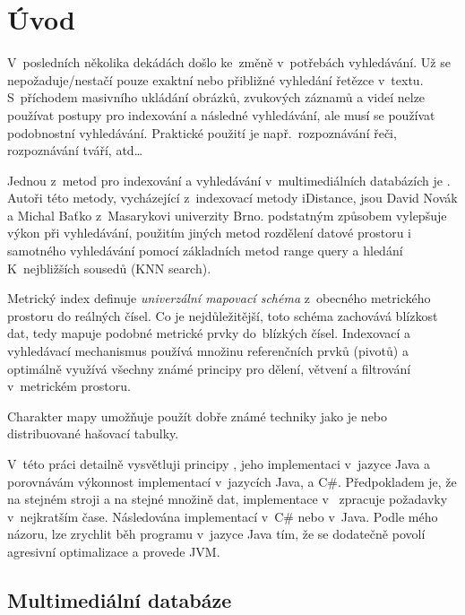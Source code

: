 \chapter{Úvod}

V~posledních několika dekádách došlo ke~změně v~potřebách vyhledávání.
Už se nepožaduje/nestačí pouze exaktní nebo přibližné vyhledání řetězce
v~textu. S~příchodem masivního ukládání obrázků, zvukových záznamů
a videí nelze používat  postupy pro indexování a následné
vyhledávání, ale musí se používat podobnostní vyhledávání. Praktické
použití je např.~rozpoznávání řeči, rozpoznávání tváří, atd\ldots{}

Jednou z~metod pro indexování a vyhledávání v~multimediálních databázích
je \MIndex{}\cite{Novak:2009:MIE:1637863.1638184}\@. Autoři této
metody, vycházející z~indexovací metody iDistance\cite{Jagadish:2005:IAB:1071610.1071612},
jsou David Novák a Michal Baťko z~Masarykovi univerzity Brno\@.
\MIndex{} podstatným způsobem vylepšuje výkon při vyhledávání, použitím
jiných metod rozdělení datové prostoru i samotného vyhledávání pomocí
základních metod range query a hledání K~nejbližších sousedů (KNN
search)\@.

Metrický index definuje \emph{univerzální mapovací schéma} z~obecného metrického prostoru do reálných čísel.
Co je nejdůležitější, toto schéma zachovává blízkost dat, tedy mapuje podobné metrické prvky do~blízkých čísel.
Indexovací a vyhledávací mechanismus  používá množinu referenčních prvků (pivotů) a optimálně využívá všechny známé principy pro dělení, větvení a filtrování v~metrickém prostoru.

Charakter mapy  umožňuje použít dobře známé techniky jako je \BPTree\cite{Cormen:2001:IA:580470} nebo distribuované hašovací tabulky.

V~této práci detailně vysvětluji principy , jeho implementaci
v~jazyce Java a porovnávám výkonnost implementací \MIndex{} v~jazycích
Java, \CC{} a C\#. Předpokladem je, že na stejném stroji a na stejné
množině dat, implementace v~\CC{} zpracuje požadavky v~nejkratším
čase. Následována implementací v~C\# nebo v~Java. Podle mého názoru,
lze zrychlit běh programu v~jazyce Java tím, že se dodatečně povolí
agresivní optimalizace a provede  JVM.

\section{Multimediální databáze}

